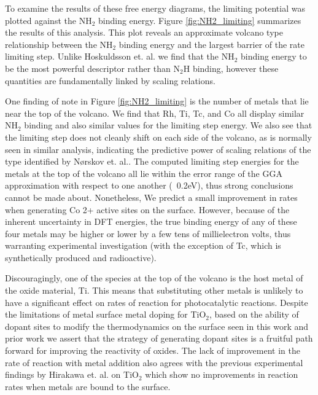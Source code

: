 To examine the results of these free energy diagrams, the limiting potential was plotted against the NH$_2$ binding energy. Figure \ref{fig:NH2_limiting} summarizes the results of this analysis. This plot reveals an approximate volcano type relationship between the NH$_2$ binding energy and the largest barrier of the rate limiting step. Unlike Hoskuldsson et. al.\cite{Hoskuldsson_2017} we find that the NH$_2$ binding energy to be the most powerful descriptor rather than N$_2$H binding, however these quantities are fundamentally linked by scaling relations.

One finding of note in Figure \ref{fig:NH2_limiting} is the number of metals that lie near the top of the volcano. We find that Rh, Ti, Tc, and Co all display similar NH$_2$ binding and also similar values for the limiting step energy. We also see that the limiting step does not cleanly shift on each side of the volcano, as is normally seen in similar analysis, indicating the predictive power of scaling relations of the type identified by N{\o}rskov et. al.\cite{N_rskov_2004}. The computed limiting step energies for the metals at the top of the volcano all lie within the error range of the GGA approximation with respect to one another (~0.2eV)\cite{}, thus strong conclusions cannot be made about. Nonetheless, We predict a small improvement in rates when generating Co 2+ active sites on the surface. However, because of the inherent uncertainty in DFT energies, the true binding energy of any of these four metals may be higher or lower by a few tens of millielectron volts, thus warranting experimental investigation (with the exception of Tc, which is synthetically produced and radioactive).

Discouragingly, one of the species at the top of the volcano is the host metal of the oxide material, Ti. This means that substituting other metals is unlikely to have a significant effect on rates of reaction for photocatalytic reactions. Despite the limitations of metal surface metal doping for TiO$_2$, based on the ability of dopant sites to modify the thermodynamics on the surface seen in this work and prior work \cite{Xu_2015,Yao_2017} we assert that the strategy of generating dopant sites is a fruitful path forward for improving the reactivity of oxides. The lack of improvement in the rate of reaction with metal addition also agrees with the previous experimental findings by Hirakawa et. al.\cite{Hirakawa_2017} on TiO$_2$ which show no improvements in reaction rates when metals are bound to the surface.


